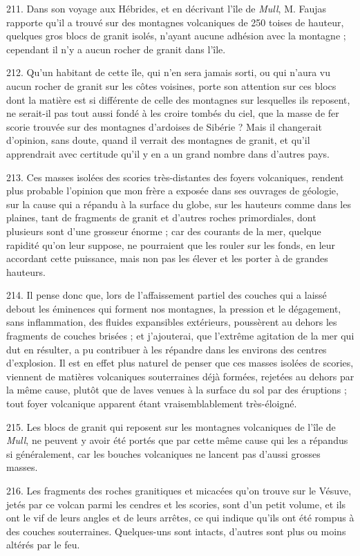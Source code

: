 \documentclass[a4paper, 11pt, oneside, polutonikogreek, french]{article}
\begin{document}
211. Dans son voyage aux Hébrides, et en décrivant l'île de \emph{Mull}, M. Faujas rapporte qu'il a trouvé sur des montagnes volcaniques de 250 toises de hauteur, quelques gros blocs de granit isolés, n'ayant aucune adhésion avec la montagne ; cependant il n'y a aucun rocher de granit dans l'île.

212. Qu'un habitant de cette île, qui n'en sera jamais sorti, ou qui n'aura vu aucun rocher de granit sur les côtes voisines, porte son attention sur ces blocs dont la matière est si différente de celle des montagnes sur lesquelles ils reposent, ne serait-il pas tout aussi fondé à les croire tombés du ciel, que la masse de fer scorie trouvée sur des montagnes d'ardoises de Sibérie ? Mais il changerait d'opinion, sans doute, quand il verrait des montagnes de granit, et qu'il apprendrait avec certitude qu'il y en a un grand nombre dans d'autres pays.

213. Ces masses isolées des scories très-distantes des foyers volcaniques, rendent plus probable l'opinion que mon frère a exposée dans ses ouvrages de géologie, sur la cause qui a répandu à la surface du globe, sur les hauteurs comme dans les plaines, tant de fragments de granit et d'autres roches primordiales, dont plusieurs sont d'une grosseur énorme ; car des courants de la mer, quelque rapidité qu'on leur suppose, ne pourraient que les rouler sur les fonds, en leur accordant cette puissance, mais non pas les élever et les porter à de grandes hauteurs.

214. Il pense donc que, lors de l'affaissement partiel des couches qui a laissé debout les éminences qui forment nos montagnes, la pression et le dégagement, sans inflammation, des fluides expansibles extérieurs, poussèrent au dehors les fragments de couches brisées ; et j'ajouterai, que l'extrême agitation de la mer qui dut en résulter, a pu contribuer à les répandre dans les environs des centres d'explosion. Il est en effet plus naturel de penser que ces masses isolées de scories, viennent de matières volcaniques souterraines déjà formées, rejetées au dehors par la même cause, plutôt que de laves venues à la surface du sol par des éruptions ; tout foyer volcanique apparent étant vraisemblablement très-éloigné.

215. Les blocs de granit qui reposent sur les montagnes volcaniques de l'île de \emph{Mull}, ne peuvent y avoir été portés que par cette même cause qui les a répandus si généralement, car les bouches volcaniques ne lancent pas d'aussi grosses masses.

216. Les fragments des roches granitiques et micacées qu'on trouve sur le Vésuve, jetés par ce volcan parmi les cendres et les scories, sont d'un petit volume, et ils ont le vif de leurs angles et de leurs arrêtes, ce qui indique qu'ils ont été rompus à des couches souterraines. Quelques-uns sont intacts, d'autres sont plus ou moins altérés par le feu.
\end{document}
